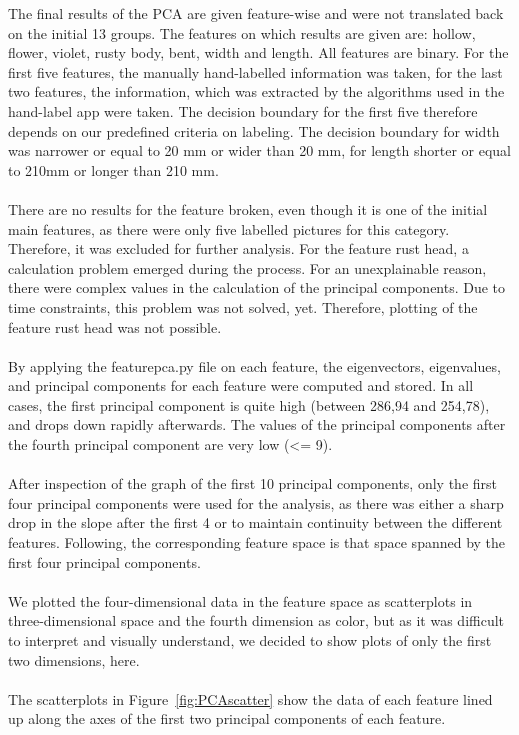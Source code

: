 The final results of the PCA are given feature-wise and were not translated back on the initial 13 groups. The features on which results are given are: hollow, flower, violet, rusty body, bent, width and length. All features are binary. For the first five features, the manually hand-labelled information was taken, for the last two features, the information, which was extracted by the algorithms used in the hand-label app were taken. The decision boundary for the first five therefore depends on our predefined criteria on labeling. The decision boundary for width was narrower or equal to 20 mm or wider than 20 mm, for length shorter or equal to 210mm or longer than 210 mm.  \\
\\
There are no results for the feature broken, even though it is one of the initial main features, as there were only five labelled pictures for this category. Therefore, it was excluded for further analysis. For the feature rust head, a calculation problem emerged during the process. For an unexplainable reason, there were complex values in the calculation of the principal components. Due to time constraints, this problem was not solved, yet. Therefore, plotting of the feature rust head was not possible.  \\
\\
By applying the feature\textunderscore pca.py file on each feature, the eigenvectors, eigenvalues, and principal components for each feature were computed and stored. In all cases, the first principal component is quite high (between 286,94 and 254,78), and drops down rapidly afterwards. The values of the principal components after the fourth principal component are very low (<= 9).  \\
\\
After inspection of the graph of the first 10 principal components,  only the  first four principal components were used for the analysis, as there was either a sharp drop in the slope after the first 4 or to maintain continuity between the different features. Following, the corresponding feature space is that space spanned by the first four principal components.  \\
 \\
We plotted the four-dimensional data in the feature space as scatterplots in three-dimensional space and the fourth dimension as color, but as it was difficult to interpret and visually understand, we decided to show plots of only the first two dimensions, here. \\ 
\\ 
The scatterplots in Figure~\ref{fig:PCAscatter} show the data of each feature lined up along the axes of the first two principal components of each feature. \\

